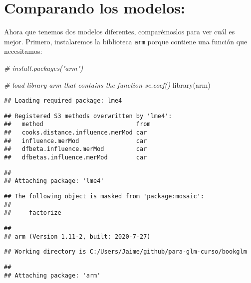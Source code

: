 \documentclass[
]{book}
\newenvironment{Shaded}{\begin{snugshade}}{\end{snugshade}}
\newcommand{\CommentTok}[1]{\textcolor[rgb]{0.56,0.35,0.01}{\textit{#1}}}
\newcommand{\FunctionTok}[1]{\textcolor[rgb]{0.00,0.00,0.00}{#1}}
\newcommand{\NormalTok}[1]{#1}
\begin{document}
\hypertarget{comparando-los-modelos}{%
\section{Comparando los modelos:}\label{comparando-los-modelos}}

Ahora que tenemos dos modelos diferentes, comparémoslos para ver cuál es mejor. Primero, instalaremos la biblioteca \texttt{arm} porque contiene una función que necesitamos:

\begin{Shaded}
\begin{Highlighting}[]
\CommentTok{\# install.packages("arm")}

\CommentTok{\# load library arm that contains the function se.coef()}
\FunctionTok{library}\NormalTok{(arm)}
\end{Highlighting}
\end{Shaded}

\begin{verbatim}
## Loading required package: lme4
\end{verbatim}

\begin{verbatim}
## Registered S3 methods overwritten by 'lme4':
##   method                          from
##   cooks.distance.influence.merMod car 
##   influence.merMod                car 
##   dfbeta.influence.merMod         car 
##   dfbetas.influence.merMod        car
\end{verbatim}

\begin{verbatim}
## 
## Attaching package: 'lme4'
\end{verbatim}

\begin{verbatim}
## The following object is masked from 'package:mosaic':
## 
##     factorize
\end{verbatim}

\begin{verbatim}
## 
## arm (Version 1.11-2, built: 2020-7-27)
\end{verbatim}

\begin{verbatim}
## Working directory is C:/Users/Jaime/github/para-glm-curso/bookglm
\end{verbatim}

\begin{verbatim}
## 
## Attaching package: 'arm'
\end{verbatim}
\end{document}
